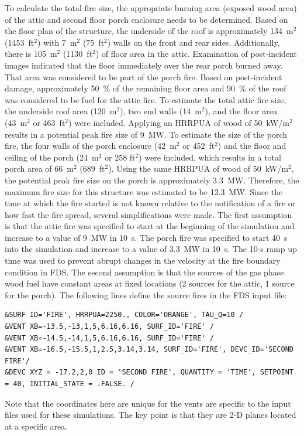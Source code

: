 \documentclass[12pt,oneside]{book}
\begin{document}
To calculate the total fire size, the appropriate burning area (exposed wood area) of the attic and second floor porch enclosure needs to be determined. Based on the floor plan of the structure, the underside of the roof is approximately 134~m$^2$ (1453~ft$^2$) with 7~m$^2$ (75~ft$^2$) walls on the front and rear sides. Additionally, there is 105~m$^2$ (1130~ft$^2$) of floor area in the attic. Examination of post-incident images indicated that the floor immediately over the rear porch burned away. That area was considered to be part of the porch fire. Based on post-incident damage, approximately 50~\% of the remaining floor area and 90~\% of the roof was considered to be fuel for the attic fire. To estimate the total attic fire size, the underside roof area (120~m$^2$), two end walls (14~m$^2$), and the floor area (43~m$^2$ or 463~ft$^2$) were included. Applying an HRRPUA of wood of 50~kW/m$^2$ results in a potential peak fire size of 9~MW. To estimate the size of the porch fire, the four walls of the porch enclosure (42~m$^2$ or 452~ft$^2$) and the floor and ceiling of the porch (24~m$^2$ or 258 ft$^2$) were included, which results in a total porch area of 66~m$^2$ (689~ft$^2$). Using the same HRRPUA of wood of 50~kW/m$^2$, the potential peak fire size on the porch is approximately 3.3~MW. Therefore, the maximum fire size for this structure was estimated to be 12.3~MW. Since the time at which the fire started is not known relative to the notification of a fire or how fast the fire spread, several simplifications were made. The first assumption is that the attic fire was specified to start at the beginning of the simulation and increase to a value of 9~MW in 10~s. The porch fire was specified to start 40~s into the simulation and increase to a value of 3.3~MW in 10~s. The 10-s ramp up time was used to prevent abrupt changes in the velocity at the fire boundary condition in FDS. The second assumption is that the sources of the gas phase wood fuel have constant areas at fixed locations (2 sources for the attic, 1 source for the porch). The following lines define the source fires in the FDS input file:

\begin{lstlisting}
&SURF ID='FIRE', HRRPUA=2250., COLOR='ORANGE', TAU_Q=10 /
&VENT XB=-13.5,-13,1,5,6.16,6.16, SURF_ID='FIRE' / 
&VENT XB=-14.5,-14,1,5,6.16,6.16, SURF_ID='FIRE' / 
&VENT XB=-16.5,-15.5,1,2.5,3.14,3.14, SURF_ID='FIRE', DEVC_ID='SECOND FIRE'/ 
&DEVC XYZ = -17.2,2,0 ID = 'SECOND FIRE', QUANTITY = 'TIME', SETPOINT = 40, INITIAL_STATE = .FALSE. /
\end{lstlisting}
Note that the coordinates here are unique for the vents are specific to the input files used for these simulations. The key point is that they are 2-D planes located at a specific area.
\end{document}
